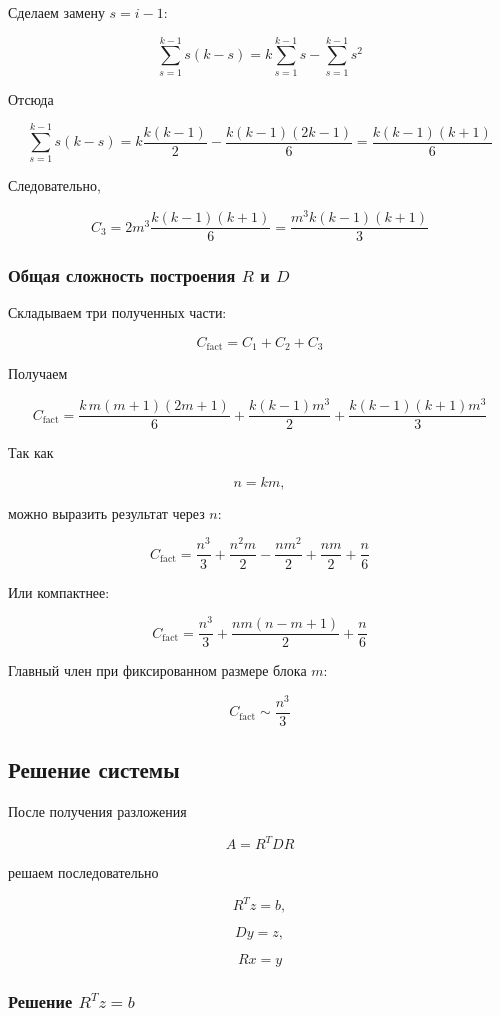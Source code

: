 \documentclass[a4paper,12pt]{article}
\begin{document}
Сделаем замену \(s=i-1\):

$$
\sum_{s=1}^{k-1}s(k-s)
=
k\sum_{s=1}^{k-1}s
-
\sum_{s=1}^{k-1}s^2
$$

Отсюда

$$
\sum_{s=1}^{k-1}s(k-s)
=
k\frac{k(k-1)}2
-
\frac{k(k-1)(2k-1)}6
=
\frac{k(k-1)(k+1)}6
$$

Следовательно,

$$
C_3
=
2m^3
\frac{k(k-1)(k+1)}6
=
\frac{m^3k(k-1)(k+1)}3
$$

\subsubsection{Общая сложность построения \(R\) и \(D\)}

Складываем три полученных части:

$$
C_{\text{fact}}
=
C_1+C_2+C_3
$$

Получаем

$$
C_{\text{fact}}
=
\frac{k\,m(m+1)(2m+1)}6
+
\frac{k(k-1)m^3}{2}
+
\frac{k(k-1)(k+1)m^3}{3}
$$

Так как

$$
n=km,
$$

можно выразить результат через \(n\):

$$
C_{\text{fact}}
=
\frac{n^3}{3}
+
\frac{n^2m}{2}
-
\frac{nm^2}{2}
+
\frac{nm}{2}
+
\frac{n}{6}
$$

Или компактнее:

$$
C_{\text{fact}}
=
\frac{n^3}{3}
+
\frac{nm(n-m+1)}{2}
+
\frac{n}{6}
$$

Главный член при фиксированном размере блока \(m\):

$$
C_{\text{fact}}
\sim
\frac{n^3}{3}
$$

\subsection{Решение системы}

После получения разложения

$$
A=R^TDR
$$

решаем последовательно

$$
R^Tz=b,
$$

$$
Dy=z,
$$

$$
Rx=y
$$

\subsubsection{Решение \(R^Tz=b\)}
\end{document}
